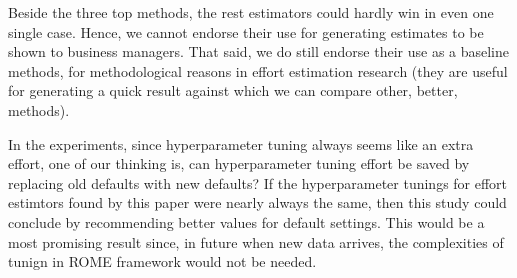 \documentclass[sigconf,review,anonymous]{acmart}
\begin{document}
Beside the three top methods, the rest estimators could hardly win in even one single case. Hence, we cannot endorse their use for generating estimates to be shown to business managers.
That said, we do still endorse their use as a  baseline methods, for methodological reasons in effort estimation research (they are useful for generating a quick result against which we can compare other, better, methods).

In the experiments, since hyperparameter tuning always seems like an extra effort, one of our thinking is, can hyperparameter tuning effort be saved by replacing old defaults with new defaults? If the hyperparameter tunings for effort estimtors found by this paper were nearly always the same, then this study
could conclude by recommending better values for default settings. This would
be a most promising result since, in future when new data arrives, the complexities of tunign in ROME framework would not be needed. 
\end{document}
